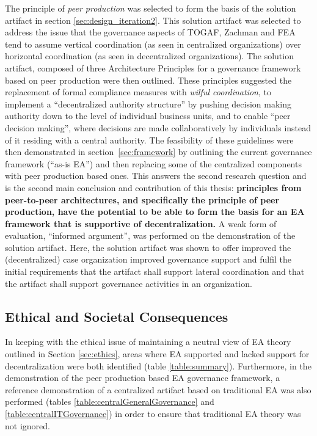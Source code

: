 The principle of \textit{peer production} was selected to form the basis of the solution artifact in section \ref{sec:design_iteration2}. This solution artifact was selected to address the issue that the governance aspects of TOGAF, Zachman and FEA tend to assume vertical coordination (as seen in centralized organizations) over horizontal coordination (as seen in decentralized organizations). The solution artifact, composed of three Architecture Principles for a governance framework based on peer production were then outlined. These principles suggested the replacement of formal compliance measures with \textit{wilful coordination}, to implement a ``decentralized authority structure'' by pushing decision making authority down to the level of individual business units, and to enable ``peer decision making'', where decisions are made collaboratively by individuals instead of it residing with a central authority. The feasibility of these guidelines were then demonstrated in section~\ref{sec:framework} by outlining the current governance framework (``as-is EA'') and then replacing some of the centralized components with peer production based ones. This answers the second research question and is the second main conclusion and contribution of this thesis: \textbf{principles from peer-to-peer architectures, and specifically the principle of peer production, have the potential to be able to form the basis for an EA framework that is supportive of decentralization.} A weak form of evaluation, ``informed argument'', was performed on the demonstration of the solution artifact. Here, the solution artifact was shown to offer improved the (decentralized) case organization improved governance support and fulfil the initial requirements that the artifact shall support lateral coordination and that the artifact shall support governance activities in an organization.

\subsection{Ethical and Societal Consequences}

In keeping with the ethical issue of maintaining a neutral view of EA theory outlined in Section \ref{sec:ethics}, areas where EA supported and lacked support for decentralization were both identified (table \ref{table:summary}). Furthermore, in the demonstration of the peer production based EA governance framework, a reference demonstration of a centralized artifact based on traditional EA was also performed (tables \ref{table:centralGeneralGovernance} and \ref{table:centralITGovernance}) in order to ensure that traditional EA theory was not ignored. 

